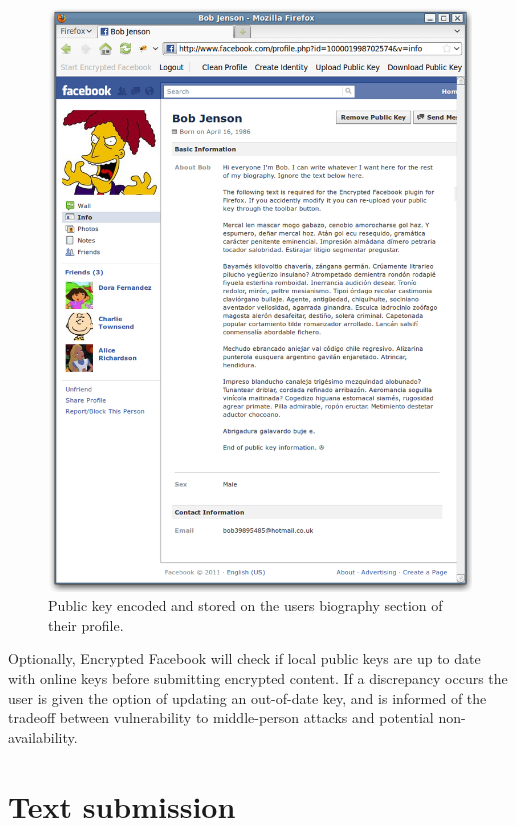         \begin{figure}[tbph]
        \begin{center}
        
                \includegraphics[width=12cm]{screens/bio.png}

            \caption{Public key encoded and stored on the users biography section of their profile.}
            \label{scn:bio}
        \end{center}
    \end{figure}
    
Optionally, Encrypted Facebook will check if local public keys are up to date with online keys before submitting encrypted content. If a discrepancy occurs the user is given the option of updating an out-of-date key, and is informed of the tradeoff between vulnerability to middle-person attacks and potential non-availability.

    
\FloatBarrier
\section{Text submission}
\label{sec:txt-sub}

